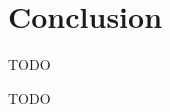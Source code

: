 \documentclass[acmsmall]{acmart}
\begin{document}
\section{Conclusion} \label{sec:conclusion}

TODO %


\begin{acks}
    TODO %
\end{acks}



\end{document}

